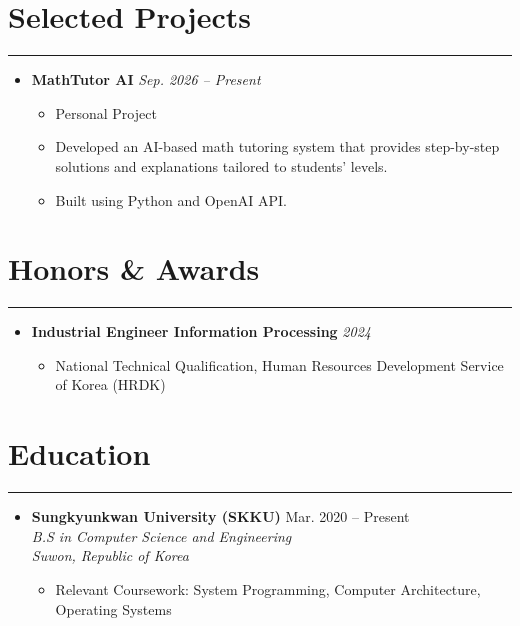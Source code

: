 \documentclass[letterpaper, 10pt]{article}
\begin{document}
\section*{Selected Projects}
\hrule
\vspace{4pt}
\begin{itemize}
\item[]
\textbf{\large MathTutor AI} \hfill \textit{Sep. 2026 -- Present} 

\begin{itemize}
    \item Personal Project

    \item Developed an AI-based math tutoring system
    that provides step-by-step solutions and
    explanations tailored to students' levels.

    \item Built using Python and
    OpenAI API.
\end{itemize}
\end{itemize}

\section*{Honors \& Awards}
\hrule
\vspace{4pt}
\begin{itemize}
    \setlength{\itemsep}{2pt}
    \item \textbf{Industrial Engineer Information Processing}
    \hfill \textit{2024}
    
    \begin{itemize}
        \item National Technical Qualification,
        Human Resources Development Service of Korea (HRDK)
    \end{itemize}
\end{itemize}
\section*{Education}
\hrule
\vspace{4pt}
\begin{itemize}
\item[]
\textbf{Sungkyunkwan University (SKKU)} \hfill Mar. 2020 -- Present \\
\textit{B.S in Computer Science and Engineering} \\
\textit{Suwon, Republic of Korea}
\begin{itemize}
\item Relevant Coursework: System Programming, Computer Architecture, Operating Systems
\end{itemize}
\end{itemize}
\end{document}

